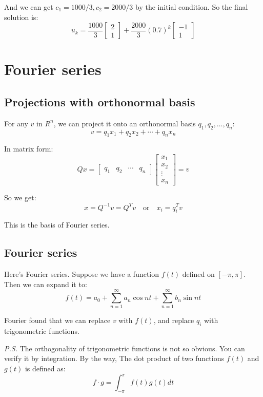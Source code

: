 \documentclass[10pt,a4paper,oneside,numbers=noenddot]{scrbook}
\theoremstyle{ctplain}
\theoremstyle{ctresult}
\begin{document}
And we can get $c_1 = 1000/3, c_2 = 2000/3$ by the initial condition. So the final
solution is:
\[
  u_k = \frac{1000}{3} \begin{bmatrix}
    2 \\
    1
  \end{bmatrix} +
  \frac{2000}{3} (0.7)^k \begin{bmatrix}
    -1 \\
    1
  \end{bmatrix}
\]

\section{Fourier series}
\subsection{Projections with orthonormal basis}

For any $v$ in $R^n$, we can project it onto an orthonormal basis $q_1, q_2, \ldots, q_n$:
\[
  v = q_1x_1 + q_2x_2 + \cdots + q_nx_n
\]

In matrix form:
\[
  Qx = \begin{bmatrix}
    q_1 & q_2 & \cdots & q_n
  \end{bmatrix}
  \begin{bmatrix}
    x_1 \\
    x_2 \\
    \vdots \\
    x_n
  \end{bmatrix} = v
\]

So we get:
\[
  x = Q^{-1}v = Q^{T}v \quad \text{or} \quad x_i = q_i^{T}v
\]

This is the basis of Fourier series.

\subsection{Fourier series}

Here's Fourier series. Suppose we have a function $f(t)$ defined on $[-\pi, \pi]$.
Then we can expand it to:
\[
  f(t) = a_0 + \sum_{n=1}^{\infty} a_n \cos nt + \sum_{n=1}^{\infty} b_n \sin nt
\]

Fourier found that we can replace $v$ with $f(t)$, and replace $q_i$ with
trigonometric functions.

\emph{P.S.} The orthogonality of trigonometric functions is not so obvious. You can
verify it by integration. By the way, The dot product of two functions $f(t)$ and $g(t)$
is defined as:
\[
  f \cdot g = \int_{-\pi}^{\pi} f(t)g(t) dt
\]
\end{document}
